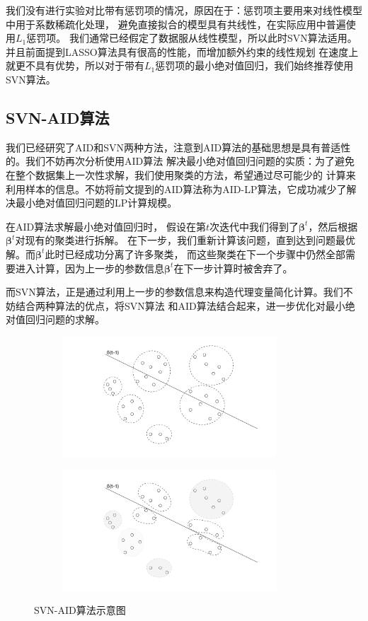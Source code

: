 我们没有进行实验对比带有惩罚项的情况，原因在于：惩罚项主要用来对线性模型中用于系数稀疏化处理，
避免直接拟合的模型具有共线性，在实际应用中普遍使用$L_1$惩罚项。
我们通常已经假定了数据服从线性模型，所以此时SVN算法适用。并且前面提到LASSO算法具有很高的性能，而增加额外约束的线性规划
在速度上就更不具有优势，所以对于带有$L_1$惩罚项的最小绝对值回归，我们始终推荐使用SVN算法。


\subsection{SVN-AID算法}
我们已经研究了AID和SVN两种方法，注意到AID算法的基础思想是具有普适性的。我们不妨再次分析使用AID算法
解决最小绝对值回归问题的实质：为了避免在整个数据集上一次性求解，我们使用聚类的方法，希望通过尽可能少的
计算来利用样本的信息。不妨将前文提到的AID算法称为AID-LP算法，它成功减少了解决最小绝对值回归问题的LP计算规模。

在AID算法求解最小绝对值回归时，
假设在第$t$次迭代中我们得到了$\bm{\beta}^t$，然后根据$\bm{\beta}^t$对现有的聚类进行拆解。
在下一步，我们重新计算该问题，直到达到问题最优解。而$\bm{\beta}^t$此时已经成功分离了许多聚类，
而这些聚类在下一个步骤中仍然全部需要进入计算，因为上一步的参数信息$\bm{\beta}^t$在下一步计算时被舍弃了。

而SVN算法，正是通过利用上一步的参数信息来构造代理变量简化计算。我们不妨结合两种算法的优点，将SVN算法
和AID算法结合起来，进一步优化对最小绝对值回归问题的求解。

\begin{figure}[H]
    \centering
    \begin{subfigure}[t]{0.4\textwidth}\label{impro-demo1}
    \includegraphics[width=8cm]{pics/chapter2/impro-demo-1.pdf}
    \end{subfigure}
    \centering
    \begin{subfigure}[t]{0.4\textwidth}\label{impro-demo2}
    \includegraphics[width=8cm]{pics/chapter2/impro-demo-2.pdf}
    \end{subfigure}
    \caption{ \small SVN-AID算法示意图}
    \label{impro-demo}
\end{figure}

